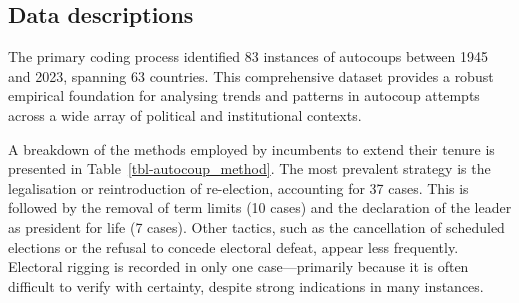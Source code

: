 \documentclass[
  12pt,
]{report}
\begin{document}
\subsection*{Data descriptions}\label{data-descriptions}

The primary coding process identified 83 instances of autocoups between
1945 and 2023, spanning 63 countries. This comprehensive dataset
provides a robust empirical foundation for analysing trends and patterns
in autocoup attempts across a wide array of political and institutional
contexts.

A breakdown of the methods employed by incumbents to extend their tenure
is presented in Table~\ref{tbl-autocoup_method}. The most prevalent
strategy is the legalisation or reintroduction of re-election,
accounting for 37 cases. This is followed by the removal of term limits
(10 cases) and the declaration of the leader as president for life (7
cases). Other tactics, such as the cancellation of scheduled elections
or the refusal to concede electoral defeat, appear less frequently.
Electoral rigging is recorded in only one case---primarily because it is
often difficult to verify with certainty, despite strong indications in
many instances.

\begin{table}

\caption{\label{tbl-autocoup_method}Autocoup methods and success rates
(1945-2023)}


\end{table}%
\end{document}
